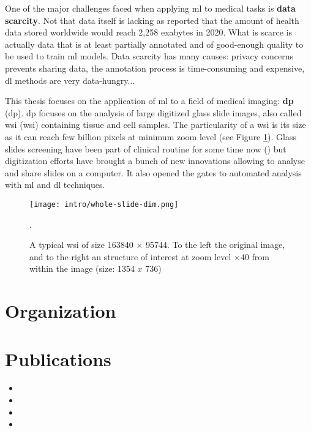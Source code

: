 One of the major challenges faced when applying \acrshort{ml} to medical tasks is \textbf{data scarcity}. Not that data itself is lacking as \parencite{pramanik2019healthcare} reported that the amount of health data stored worldwide would reach 2,258 exabytes in 2020. What is scarce is actually data that is at least partially annotated and of good-enough quality to be used to train \acrshort{ml} models. Data scarcity has many causes: privacy concerns prevents sharing data, the annotation process is time-consuming and expensive, \acrshort{dl} methods are very data-hungry... 

This thesis focuses on the application of \acrlong{ml} to a field of medical imaging: \textbf{\acrlong{dp}} (\acrshort{dp}). \acrshort{dp} focuses on the analysis of large digitized glass slide images, also called \acrlong{wsi} (\acrshort{wsi}) containing tissue and cell samples. The particularity of a \acrshort{wsi} is its size as it can reach few billion pixels at minimum zoom level (see Figure \ref{fig:intro:wsi}). Glass slides screening have been part of clinical routine for some time now () but digitization efforts have brought a bunch of new innovations allowing to analyse and share slides on a computer. It also opened the gates to automated analysis with \acrshort{ml} and \acrlong{dl} techniques.


\begin{figure}
  \texttt{[image: intro/whole-slide-dim.png]}
  \caption{A typical \acrlong{wsi} of size 163840 $\times$ 95744. To the left the original image, and to the right an structure of interest at zoom level $\times40$ from within the image (size: 1354 $x$ 736)}.
  \label{fig:intro:wsi}
\end{figure}

\section{Organization}

\section{Publications}

\begin{itemize}
  \item {}
  \item {}
  \item {}
  \item {}
\end{itemize}

